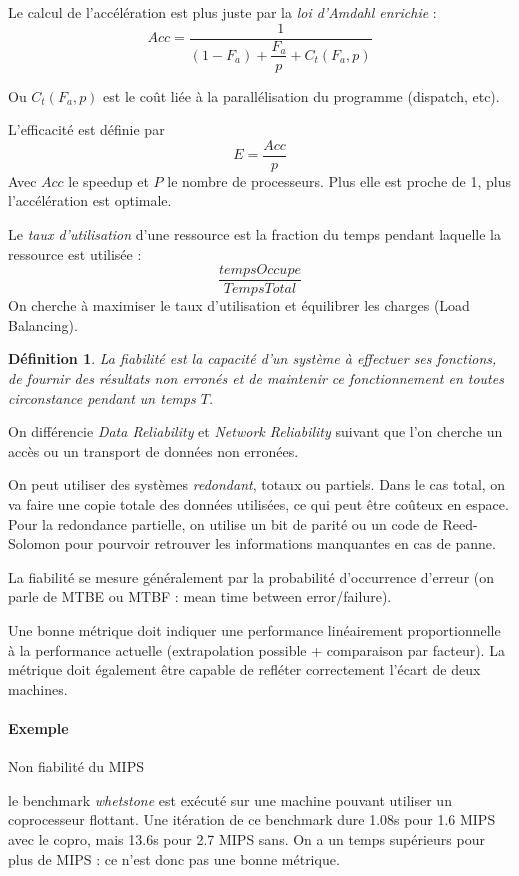 \documentclass{article}
\newtheorem{defi}{Définition}
\begin{document}
Le calcul de l'accélération est plus juste par la \emph{loi d'Amdahl enrichie} :
\[Acc = \dfrac{1}{(1-F_a)+\dfrac{F_a}{p} + C_t(F_a,p)}\]

Ou $C_t(F_a,p)$ est le coût liée à la parallélisation du programme (dispatch, etc).

L'efficacité est définie par
\[E=\dfrac{Acc}{p}\]
Avec $Acc$ le speedup et $P$ le nombre de processeurs.
Plus elle est proche de 1, plus l'accélération est optimale.


Le \emph{taux d'utilisation} d'une ressource est la fraction du temps pendant laquelle la ressource est utilisée :
\[\dfrac{tempsOccupe}{TempsTotal}\]
On cherche à maximiser le taux d'utilisation et équilibrer les charges (Load Balancing).


\begin{defi}
La \emph{fiabilité} est la capacité d'un système à effectuer ses fonctions, de fournir des résultats non erronés et de maintenir ce fonctionnement en toutes circonstance pendant un temps $T$.
\end{defi}

On différencie \emph{Data Reliability} et \emph{Network Reliability} suivant que l'on cherche un accès ou un transport de données non erronées.

On peut utiliser des systèmes \emph{redondant}, totaux ou partiels. Dans le cas total, on va faire une copie totale des données utilisées, ce qui peut être coûteux en espace. Pour la redondance partielle, on utilise un bit de parité ou un code de Reed-Solomon pour pourvoir retrouver les informations manquantes en cas de panne.

La fiabilité se mesure généralement par la probabilité d'occurrence d'erreur (on parle de MTBE ou MTBF : mean time between error/failure).

Une bonne métrique doit indiquer une performance linéairement proportionnelle à la performance actuelle (extrapolation possible + comparaison par facteur). La métrique doit également être capable de refléter correctement l'écart de deux machines.

\paragraph{Exemple}
Non fiabilité du MIPS

le benchmark \emph{whetstone} est exécuté sur une machine pouvant utiliser un coprocesseur flottant. Une itération de ce benchmark dure 1.08s pour 1.6 MIPS avec le copro, mais 13.6s pour 2.7 MIPS sans. On a un temps supérieurs pour plus de MIPS : ce n'est donc pas une bonne métrique.
\bigskip
\end{document}
